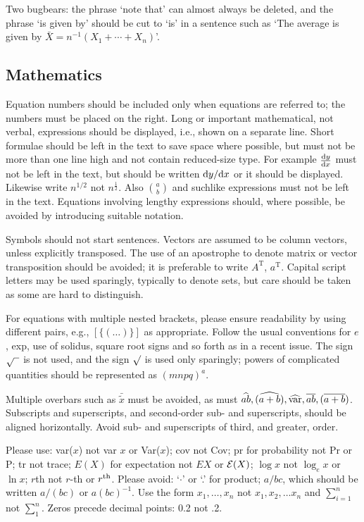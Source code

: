 \documentclass[lineno]{biometrika}
\def\T{{ \mathrm{\scriptscriptstyle T} }}
\begin{document}
Two bugbears: the phrase `note that' can almost always be deleted, and the phrase `is given by' should be cut to `is' in a sentence such as `The average is given by $\bar X=n^{-1}(X_1+\cdots+X_n)$'.

\subsection{Mathematics}

 Equation numbers should be included only when equations are referred to; the
numbers must be placed on the right. Long or important mathematical, not verbal,
expressions should be displayed, i.e., shown on a separate line. Short formulae should be
left in the text to save space where possible, but must not be more than one line high and
not contain reduced-size type. For example $\frac{{\rm d}y}{{\rm d}x}$ must not be left in the text, but should be
written ${{\rm d}y}/{{\rm d}x}$ or it should be displayed. Likewise write $n^{1/2}$ not $n^{\frac12}$.   Also $\displaystyle{a\choose{b}}$ and suchlike expressions
 must not be left in the text. Equations
involving lengthy expressions should, where possible, be avoided by introducing suitable
notation.

Symbols should not start sentences.  Vectors are assumed to be column vectors, unless
explicitly transposed. The use of an apostrophe to denote matrix or vector transposition should be avoided; it is preferable to write $A^\T$, $a^\T$.   Capital script letters may be used sparingly, typically to denote sets,
but care should be taken as some are hard to distinguish.

For equations with multiple nested brackets, please ensure readability by using different pairs, e.g., $[\{(\ldots)\}]$ as appropriate.   Follow the usual conventions for $e$, exp, use of solidus, square root signs and so forth
as in a recent issue. The sign $\sqrt{\hphantom{a}}$ is not used, and  the sign $\surd$ is used
only sparingly; powers of complicated quantities should be represented as $(mnpq)^{a}$.

Multiple overbars such as $\bar{\tilde{x}}$ must be avoided, as must $\widehat{ab}, (\widehat{a+b}), \widehat{\rm var}, \overline{ab},(\overline{a+b})$. Subscripts and superscripts, and second-order sub- and
superscripts, should be aligned horizontally. Avoid sub- and superscripts of third, and greater, order.

Please use: var($x$) not var $x$ or Var($x$); cov not Cov; pr for probability not Pr or P;
tr not trace; $E(X)$ for expectation not $EX$ or ${\cal E}(X)$; $\log x$ not $\log_e x$ or $\ln x$; $r$th not $r$-th or $r^{\rm th}$.
Please avoid: `$\cdot$' or `.' for product; $a/bc$, which should be written $a/(bc)$ or $a(bc)^{-1}$. Use the form $x_1,\ldots , x_n$ not $x_1, x_2,\ldots x_n$ and $\sum^{n}_{i=1}$ not $\sum^n_1$. Zeros precede decimal points: 0.2 not .2.
\end{document}
